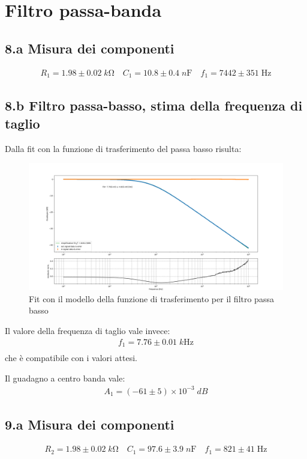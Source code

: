 \documentclass[10pt, a4paper, italian]{article}
\begin{document}
\section*{Filtro passa-banda}

\subsection*{8.a Misura dei componenti}
\begin{align*}
R_1 = 1.98 \pm 0.02 \; \si{k\ohm} \quad C_1 = 10.8 \pm 0.4 \; \si{n\F} \quad
f_1 = 7442 \pm 351 \; \si{\Hz}
\end{align*}

\subsection*{8.b Filtro passa-basso, stima della frequenza di taglio}
Dalla fit con la funzione di trasferimento del passa basso risulta:
\begin{figure}[htb]
\centering
\includegraphics[scale=0.35]{passa_basso}
\caption{Fit con il modello della funzione di trasferimento per il filtro passa basso}
\end{figure}
Il valore della frequenza di taglio vale invece:
\begin{align*}
f_1 = 7.76 \pm 0.01 \; \si{k\Hz}\\
\end{align*}
che è compatibile con i valori attesi.

Il guadagno a centro banda vale:
\begin{align*}
A_1 = (-61 \pm 5) \times 10^{-3} \; \si{dB}
\end{align*}

\subsection*{9.a Misura dei componenti}
\begin{align*}
R_2 = 1.98 \pm 0.02 \; \si{k\ohm} \quad C_1 = 97.6 \pm 3.9 \; \si{n\F} \quad
f_1 = 821 \pm 41 \; \si{\Hz}
\end{align*}
\end{document}
